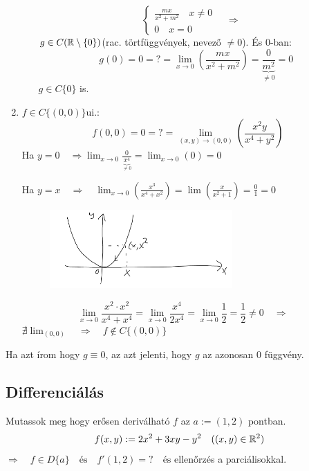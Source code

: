 \documentclass[a4paper,11.5pt]{article}
\begin{document}
\begin{task}
\begin{enumerate}
\begin{enumerate}
\[\begin{cases}
					\frac{mx}{x^2+m^2}\quad x\not=0\\
					0\quad x=0
				\end{cases}\quad \Rightarrow\quad   \]
				$g\in C(\mathbb{R}\setminus\{0\})$\quad (rac. törtfüggvények, nevező $\not=0$). És 0-ban:
				\[ g(0)=0=?=\lim_{x\to0}\left(\frac{mx}{x^2+m^2}\right)=\frac{0}{\underbrace{m^2}_{\not=0}}=0 \]
				$g\in C\{0\}$ is.
			\end{enumerate}
			\item $f\in C\{ (0,0) \}$\quad ui.:
			\[ f(0,0)=0=?=\lim_{(x,y)\to(0,0)}\left(\frac{x^2y}{x^4+y^2}\right) \]
			Ha $y=0\quad \Rightarrow\lim_{x\to0}\frac{0}{\underbrace{x^4}_{\not=0}}=\lim_{x\to0}(0)=0$
			
			Ha $y=x\quad \Rightarrow\quad \lim_{x\to0}\left(\frac{x^3}{x^4+x^2}\right)=\lim\left(\frac{x}{x^2+1}\right)=\frac{0}{1}=0$
			
			\begin{figure}[H]
				\centering
				\includegraphics[height=3cm]{kepek/27.png}
				\caption{}
			\end{figure}
			\[ \lim_{x\to0}\frac{x^2\cdot x^2}{x^4+x^4}=\lim_{x\to0}\frac{x^4}{2x^4}=\lim_{x\to0}\frac{1}{2}=\frac{1}{2}\not=0\quad \Rightarrow\quad  \]
			$\nexists\lim_{(0,0)}\quad \Rightarrow \quad f\notin C\{(0,0)\}$
		\end{enumerate}
		\begin{note}
			Ha azt írom hogy $g\equiv0$, az azt jelenti, hogy $g$ az azonosan 0 függvény.
		\end{note}
		\subsection{Differenciálás}
		\begin{task} Mutassok meg hogy erősen deriválható $f$ az $a:=(1,2)$ pontban.
			\[ f(x,y):=2x^2+3xy-y^2 \quad ((x,y)\in\mathbb{R}^2) \]
			$\Rightarrow\quad f\in D\{a\}\quad \text{és}\quad f'(1,2)=?\quad \text{és}$ ellenőrzés a parciálisokkal.
			

\end{task}
\end{task}
\end{document}
